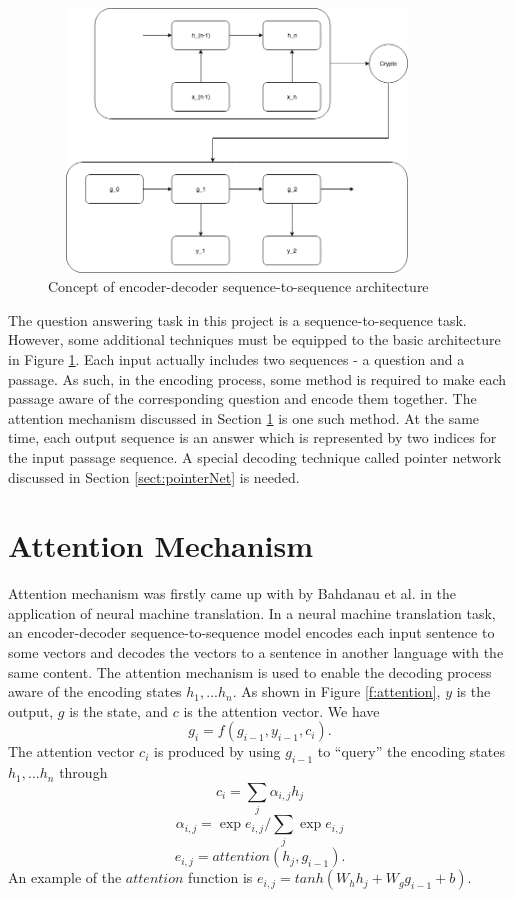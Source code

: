 \documentclass[modernstyle,12pt]{sjsuthesis}
\theoremstyle{definition}
\begin{document}
\begin{figure}[htbp]\centering
  \includegraphics[width=10cm, height=7cm]{figures/encoderDecoder.png}
  \caption{Concept of encoder-decoder sequence-to-sequence architecture}
  \label{f:encoderDecoder}
\end{figure}

The question answering task in this project is a sequence-to-sequence task. However, some additional techniques must be equipped to the basic architecture in Figure \ref{f:encoderDecoder}. Each input actually includes two sequences - a question and a passage. As such, in the encoding process, some method is required to make each passage aware of the corresponding question and encode them together. The attention mechanism discussed in Section \ref{sect:attention} is one such method. At the same time, each output sequence is an answer which is represented by two indices for the input passage sequence. A special decoding technique called pointer network discussed in Section \ref{sect:pointerNet} is needed.

\section{Attention Mechanism}\label{sect:attention}

Attention mechanism was firstly came up with by Bahdanau et al. \cite{bahdanau2014neural} in the application of neural machine translation. In a neural machine translation task, an encoder-decoder sequence-to-sequence model encodes each input sentence to some vectors and decodes the vectors to a sentence in another language with the same content. The attention mechanism is used to enable the decoding process aware of the encoding states $h_1, ... h_n$. As shown in Figure \ref{f:attention}, $y$ is the output, $g$ is the state, and $c$ is the attention vector. We have
$$g_i =f(g_{i-1},y_{i-1},c_i).$$
The attention vector $c_i$ is produced by using $g_{i-1}$ to ``query'' the encoding states $h_1, ... h_n$ through
$$c_i = \sum _j {\alpha _{i,j} h_j}$$
$$\alpha _{i,j} = \exp{e_{i,j}} / \sum _j {\exp{e_{i,j}}}$$
$$e_{i,j} = attention(h_j, g_{i-1}).$$
An example of the $attention$ function is $e_{i,j} = tanh(W_h h_j + W_g g_{i-1} + b)$.
\end{document}
